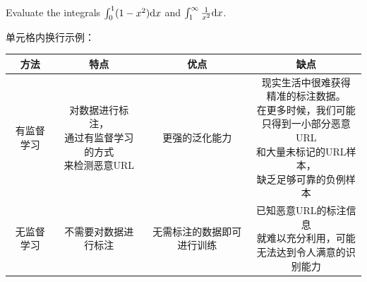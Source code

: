 \documentclass{article}
\begin{document}
\begin{homeworkProblem}[6]
	Evaluate the integrals
	\(\int_0^1 (1 - x^2) \mathrm{d}x\)
	and
	\(\int_1^{\infty} \frac{1}{x^2} \mathrm{d}x\).
\end{homeworkProblem}


\begin{homeworkProblem}
	单元格内换行示例：\\
	
	\begin{tabular}{|c|c|c|c|}
		\hline 
		方法 & 特点 & 优点 & 缺点  \\ 
		\hline 
		有监督学习 & \tabincell{c}{对数据进行标注，\\ 通过有监督学习的方式\\ 来检测恶意URL} & 更强的泛化能力 & \tabincell{l}{现实生活中很难获得\\ 精准的标注数据。\\ 在更多时候，我们可能\\ 只得到一小部分恶意URL\\ 和大量未标记的URL样本，\\ 缺乏足够可靠的负例样本} \\ 
		\hline 
		无监督学习 & 不需要对数据进行标注 & 无需标注的数据即可进行训练 & \tabincell{c}{已知恶意URL的标注信息\\ 就难以充分利用，可能\\ 无法达到令人满意的识别能力} \\
		\hline
	\end{tabular} 
\end{homeworkProblem}
\end{document}
